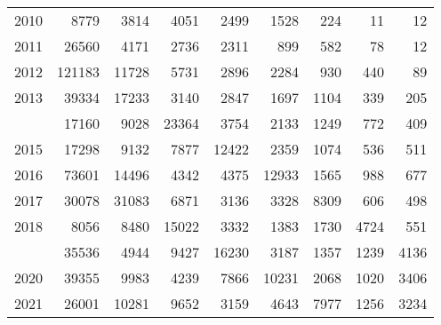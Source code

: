 \documentclass[
]{article}
\begin{document}
\begin{longtable}[t]{lrrrrrrrr}
2010 & 8779 & 3814 & 4051 & 2499 & 1528 & 224 & 11 & 12\\
2011 & 26560 & 4171 & 2736 & 2311 & 899 & 582 & 78 & 12\\
2012 & 121183 & 11728 & 5731 & 2896 & 2284 & 930 & 440 & 89\\
2013 & 39334 & 17233 & 3140 & 2847 & 1697 & 1104 & 339 & 205\\
\addlinespace
2014 & 17160 & 9028 & 23364 & 3754 & 2133 & 1249 & 772 & 409\\
2015 & 17298 & 9132 & 7877 & 12422 & 2359 & 1074 & 536 & 511\\
2016 & 73601 & 14496 & 4342 & 4375 & 12933 & 1565 & 988 & 677\\
2017 & 30078 & 31083 & 6871 & 3136 & 3328 & 8309 & 606 & 498\\
2018 & 8056 & 8480 & 15022 & 3332 & 1383 & 1730 & 4724 & 551\\
\addlinespace
2019 & 35536 & 4944 & 9427 & 16230 & 3187 & 1357 & 1239 & 4136\\
2020 & 39355 & 9983 & 4239 & 7866 & 10231 & 2068 & 1020 & 3406\\
2021 & 26001 & 10281 & 9652 & 3159 & 4643 & 7977 & 1256 & 3234\\*
\end{longtable}
\end{document}

